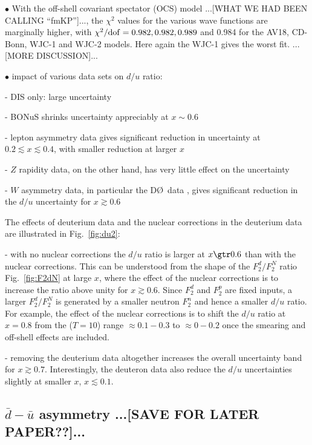 \documentclass[aps,prd,amsmath,preprint]{revtex4}
\begin{document}
$\bullet$
With the off-shell covariant spectator (OCS) model
...[WHAT WE HAD BEEN CALLING ``fmKP'']...,
the $\chi^2$ values for the various wave functions are marginally higher,
with $\chi^2/{\rm dof} = 0.982, 0.982, 0.989$ and 0.984 for the
AV18, CD-Bonn, WJC-1 and WJC-2 models.  Here again the WJC-1 gives
the worst fit.
...[MORE DISCUSSION]...


$\bullet$
impact of various data sets on $d/u$ ratio:

- DIS only: large uncertainty

- BONuS shrinks uncertainty appreciably at $x \sim 0.6$

- lepton asymmetry data gives significant reduction in uncertainty at
$0.2 \lesssim x \lesssim 0.4$, with smaller reduction at larger $x$

- $Z$ rapidity data, on the other hand, has very little effect on
the uncertainty

- $W$ asymmetry data, in particular the D\O\ data \cite{D0_W},
gives significant reduction in the $d/u$ uncertainty for
$x \gtrsim 0.6$



The effects of deuterium data and the nuclear corrections in the
deuterium data are illustrated in Fig.~\ref{fig:du2}:

- with no nuclear corrections the $d/u$ ratio is larger at $x \gtr 0.6$
than with the nuclear corrections. This can be understood from the
shape of the $F_2^d/F_2^N$ ratio Fig.~\ref{fig:F2dN} at large $x$,
where the effect of the nuclear corrections is to increase the ratio
above unity for $x \gtrsim 0.6$.  Since $F_2^d$ and $F_2^p$ are fixed
inputs, a larger $F_2^d/F_2^N$ is generated by a smaller neutron
$F_2^n$ and hence a smaller $d/u$ ratio. For example, the effect of
the nuclear corrections is to shift the $d/u$ ratio at $x = 0.8$
from the ($T=10$) range $\approx 0.1 - 0.3$ to $\approx 0 - 0.2$
once the smearing and off-shell effects are included.

- removing the deuterium data altogether increases the overall
uncertainty band for $x \gtrsim 0.7$. Interestingly, the deuteron
data also reduce the $d/u$ uncertainties slightly at smaller $x$,
$x \lesssim 0.1$.





\subsection{$\bar d - \bar u$ asymmetry
	...[SAVE FOR LATER PAPER??]...}
\label{ssec:dubar}
\end{document}
